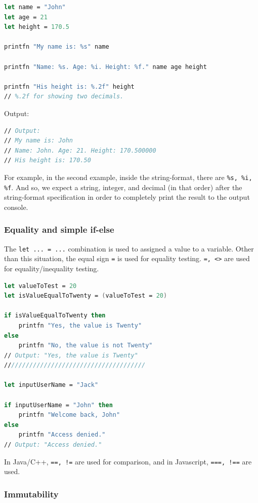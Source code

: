 \documentclass[12pt]{article}
\begin{document}
\begin{lstlisting}[language=FSharp]
let name = "John"
let age = 21
let height = 170.5

printfn "My name is: %s" name

printfn "Name: %s. Age: %i. Height: %f." name age height

printfn "His height is: %.2f" height
// %.2f for showing two decimals.
\end{lstlisting}
Output:
\begin{lstlisting}[language=FSharp]
// Output:
// My name is: John
// Name: John. Age: 21. Height: 170.500000
// His height is: 170.50
\end{lstlisting}
For example, in the second example, inside the string-format, there are \texttt{\%s, \%i, \%f}. And so, we expect a string, integer, and decimal (in that order) after the string-format specification in order to completely print the result to the output console.

\vfill

\pagebreak

\subsubsection{Equality and simple if-else}

The \texttt{let ... = ...} combination is used to assigned a value to a variable. Other than this situation, the equal sign \texttt{=} is used for equality testing. \texttt{=, <>} are used for equality/inequality testing.


\begin{lstlisting}[language=FSharp]
let valueToTest = 20
let isValueEqualToTwenty = (valueToTest = 20)

if isValueEqualToTwenty then
    printfn "Yes, the value is Twenty"
else 
    printfn "No, the value is not Twenty"
// Output: "Yes, the value is Twenty"
///////////////////////////////////////

let inputUserName = "Jack"

if inputUserName = "John" then
    printfn "Welcome back, John"
else 
    printfn "Access denied."
// Output: "Access denied."
\end{lstlisting}

In Java/C++, \texttt{==, !=} are used for comparison, and in Javascript, \texttt{===, !==} are used.

\subsubsection{Immutability}
\end{document}
